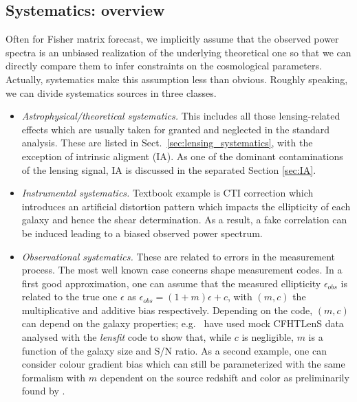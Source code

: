 \subsection{Systematics: overview}
\label{sec:WL_systematics}

Often for Fisher matrix forecast, we implicitly assume that the observed power spectra
is an unbiased realization of the underlying theoretical one so that we can
directly compare them to infer constraints on the cosmological parameters.
Actually, systematics make this assumption less than obvious. Roughly speaking,
we can divide systematics sources in three classes.

\begin{itemize}

\item{\it Astrophysical/theoretical systematics.} This includes all those
lensing-related effects which are usually taken for granted and neglected in the standard
analysis. These are listed in Sect.~\ref{sec:lensing_systematics}, with the exception
of intrinsic aligment (IA). As one of the dominant contaminations of the lensing signal,
IA is discussed in the separated Section \ref{sec:IA}.

\item{{\it Instrumental systematics.} Textbook example is CTI correction which
introduces an artificial distortion pattern which impacts the ellipticity of
each galaxy and hence the shear determination. As a result, a fake correlation
can be induced leading to a biased observed power spectrum.} \\

\item{{\it Observational systematics.} These are related to errors in the
measurement process. The most well known case concerns shape measurement codes.
In a first good approximation, one can assume that the measured ellipticity
$\epsilon_{obs}$ is related to the true one $\epsilon$ as $\epsilon_{obs} = (1
+ m) \epsilon + c$, with $(m, c)$ the multiplicative and additive bias
respectively. Depending on the code, $(m, c)$ can depend on the galaxy
properties; e.g.~\cite{CFHTLenS-shapes} have used mock CFHTLenS data analysed
with the {\it lensfit} code to show that, while $c$ is negligible, $m$ is a
function of the galaxy size and S/N ratio. As a second example, one can
consider colour gradient bias which can still be parameterized with the same
formalism with $m$ dependent on the source redshift and color as preliminarily
found by \cite{2013MNRAS.432.2385S}.}

\end{itemize}

